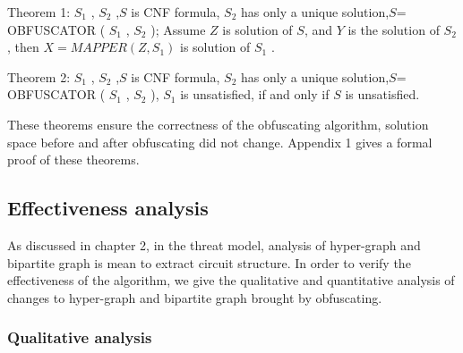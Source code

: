 \documentclass[runningheads,a4paper]{llncs}
\begin{document}
Theorem 1: $S_1$ , $S_2$ ,$S$ is CNF formula, $S_2$ has only a unique solution,$S$= OBFUSCATOR ( $S_1$ , $S_2$ ); 
 Assume $Z$ is solution of $S$, and $Y$ is the solution of $S_2$ , 
 then $X = MAPPER (Z, S_1)$ is solution of $S_1$ .

Theorem 2: $S_1$ , $S_2$ ,$S$ is CNF formula, $S_2$ has only a unique solution,$S$= OBFUSCATOR ( $S_1$ , $S_2$ ),
$S_1$  is unsatisfied, if and only if $S$ is unsatisfied.

These theorems ensure the correctness of the obfuscating algorithm, solution space before and after obfuscating did not change. Appendix 1 gives a formal proof of these theorems.
\subsection{Effectiveness analysis}

As discussed in chapter 2, in the threat model, analysis of hyper-graph and bipartite graph is mean to extract circuit structure. 
In order to verify the effectiveness of the algorithm, we give the qualitative and quantitative analysis of changes to hyper-graph and bipartite graph brought by obfuscating.
\subsubsection{Qualitative analysis}
\end{document}
